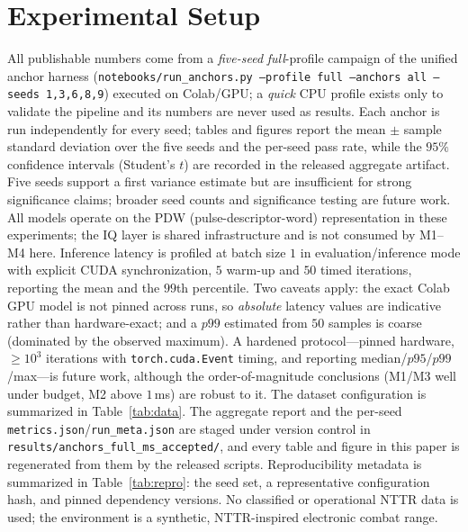 \documentclass[journal]{IEEEtran}
\begin{document}
\section{Experimental Setup}
\label{sec:setup}
All publishable numbers come from a \emph{five-seed} \emph{full}-profile campaign of the unified
anchor harness (\texttt{notebooks/run\_anchors.py --profile full --anchors all --seeds
1,3,6,8,9}) executed on Colab/GPU; a \emph{quick} CPU profile exists only to validate the
pipeline and its numbers are never used as results. Each anchor is run independently for every
seed; tables and figures report the mean $\pm$ sample standard deviation over the five seeds and
the per-seed pass rate, while the $95\%$ confidence intervals (Student's $t$) are recorded in the
released aggregate artifact. Five seeds support a first variance estimate but are insufficient
for strong significance claims; broader seed counts and significance testing are future work.
All models operate on the PDW (pulse-descriptor-word) representation in these experiments; the IQ
layer is shared infrastructure and is not consumed by M1--M4 here. Inference latency is profiled
at batch size $1$ in evaluation/inference mode with explicit CUDA synchronization, $5$ warm-up and
$50$ timed iterations, reporting the mean and the $99$th percentile. Two caveats apply: the exact
Colab GPU model is not pinned across runs, so \emph{absolute} latency values are indicative
rather than hardware-exact; and a $p99$ estimated from $50$ samples is coarse (dominated by the
observed maximum). A hardened protocol---pinned hardware, $\ge\!10^{3}$ iterations with
\texttt{torch.cuda.Event} timing, and reporting median/$p95$/$p99$/max---is future work, although
the order-of-magnitude conclusions (M1/M3 well under budget, M2 above $1$\,ms) are robust to it. The dataset
configuration is summarized in Table~\ref{tab:data}. The aggregate report and the per-seed
\texttt{metrics.json}/\texttt{run\_meta.json} are staged under version control in
\texttt{results/anchors\_full\_ms\_accepted/}, and every table and figure in this paper is
regenerated from them by the released scripts. Reproducibility metadata is summarized in
Table~\ref{tab:repro}: the seed set, a representative configuration hash, and pinned dependency
versions. No classified or operational NTTR data is used; the environment is a synthetic,
NTTR-inspired electronic combat range.
\end{document}
